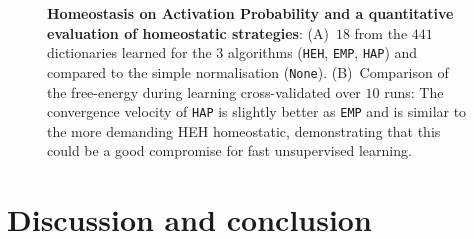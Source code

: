 \documentclass[draft]{article} %
\newcommand{\seeFig}[1]{Figure~\ref{fig:#1}}%
\begin{document}
\begin{figure}[!ht]%
\caption{
{\bf Homeostasis on Activation Probability and a quantitative evaluation of homeostatic strategies}: %
 {\sf (A)}~$18$ from the $441$ dictionaries learned for the 3 algorithms (\texttt{HEH}, \texttt{EMP}, \texttt{HAP}) and compared to the simple normalisation (\texttt{None}). {\sf (B)}~Comparison of the free-energy during learning cross-validated over $10$ runs: The convergence velocity of \texttt{HAP} is slightly better as \texttt{EMP} and is similar to the more demanding HEH homeostatic, demonstrating that this could be a good compromise for fast unsupervised learning.
\label{fig:HAP}}%
\end{figure}%

\section{Discussion and conclusion}\label{discussion-et-conclusion}
%
%
\end{document}
